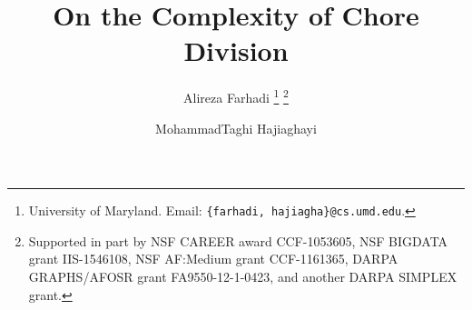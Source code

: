 \documentclass[letterpaper,11pt]{article}
\title{On the Complexity of Chore Division}
\author{
	Alireza Farhadi \thanks{University of Maryland. Email: \texttt{\{farhadi, hajiagha\}@cs.umd.edu}.}
	\thanks{Supported in part by NSF CAREER award CCF-1053605,  NSF BIGDATA grant IIS-1546108, NSF AF:Medium grant CCF-1161365, DARPA GRAPHS/AFOSR grant FA9550-12-1-0423, and another DARPA SIMPLEX grant.}
	\and MohammadTaghi Hajiaghayi \samethanks[1] \samethanks[2]
}
\begin{document}
	\newcommand{\ignore}[1]{}
\renewcommand{\theenumi}{(\roman{enumi}).}
\renewcommand{\labelenumi}{\theenumi}
\sloppy

% 
% 


\maketitle

\thispagestyle{empty}

\begin{abstract}
 
\end{abstract}



%

 

\newpage
\end{document}
